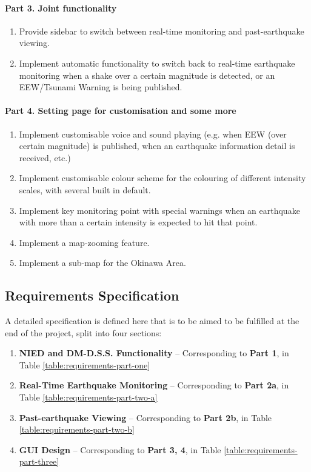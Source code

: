 \documentclass[10pt]{article}
\begin{document}
\paragraph{Part 3. Joint functionality}
\begin{enumerate}
    \item Provide sidebar to switch between real-time monitoring and past-earthquake viewing.
    \item Implement automatic functionality to switch back to real-time earthquake monitoring when a shake over a certain magnitude is detected, or an EEW/Tsunami Warning is being published.
\end{enumerate}

\paragraph{Part 4. Setting page for customisation and some more}
\begin{enumerate}
    \item Implement customisable voice and sound playing (e.g. when EEW (over certain magnitude) is published, when an earthquake information detail is received, etc.)
    \item Implement customisable colour scheme for the colouring of different intensity scales, with several built in default.
    \item Implement key monitoring point with special warnings when an earthquake with more than a certain intensity is expected to hit that point.
    \item Implement a map-zooming feature.
    \item Implement a sub-map for the Okinawa Area.
\end{enumerate}

\subsection{Requirements Specification}

A detailed specification is defined here that is to be aimed to be fulfilled at the end of the project, split into four sections:
\begin{enumerate}
    \item \textbf{NIED and DM-D.S.S. Functionality} -- Corresponding to \textbf{Part 1}, in Table \ref{table:requirements-part-one}
    \item \textbf{Real-Time Earthquake Monitoring} -- Corresponding to \textbf{Part 2a}, in Table \ref{table:requirements-part-two-a}
    \item \textbf{Past-earthquake Viewing} -- Corresponding to \textbf{Part 2b}, in Table \ref{table:requirements-part-two-b}
    \item \textbf{GUI Design} -- Corresponding to \textbf{Part 3, 4}, in Table \ref{table:requirements-part-three}
\end{enumerate}
\end{document}
